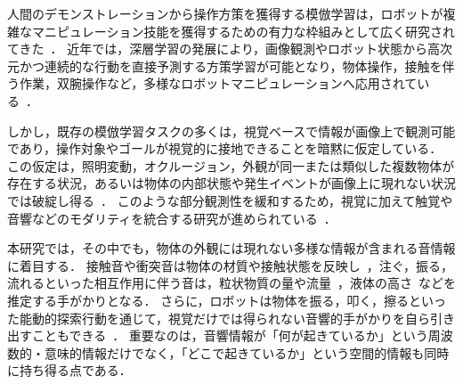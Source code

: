 \documentclass{article}
\begin{document}
人間のデモンストレーションから操作方策を獲得する模倣学習は，ロボットが複雑なマニピュレーション技能を獲得するための有力な枠組みとして広く研究されてきた~\citep{pomerleau1988alvinn,argall2009survey,osa2018algorithmic}．
近年では，深層学習の発展により，画像観測やロボット状態から高次元かつ連続的な行動を直接予測する方策学習が可能となり，物体操作，接触を伴う作業，双腕操作など，多様なロボットマニピュレーションへ応用されている~\citep{vla_survey2025}．

しかし，既存の模倣学習タスクの多くは，視覚ベースで情報が画像上で観測可能であり，操作対象やゴールが視覚的に接地できることを暗黙に仮定している．
この仮定は，照明変動，オクルージョン，外観が同一または類似した複数物体が存在する状況，あるいは物体の内部状態や発生イベントが画像上に現れない状況では破綻し得る~\citep{playitbyear}．
このような部分観測性を緩和するため，視覚に加えて触覚や音響などのモダリティを統合する研究が進められている~\citep{seehearfeel,vtt2022,sts_il2024,vitamin2024,tacthru2025,neuralfeels2024}．

本研究では，その中でも，物体の外観には現れない多様な情報が含まれる音情報に着目する．
接触音や衝突音は物体の材質や接触状態を反映し~\citep{eppe2018interactive,jin2019openenv,seehearfeel,thatsoundsright,hearingtouch2024,maniwav,multigen2025}，注ぐ，振る，流れるといった相互作用に伴う音は，粒状物質の量や流量~\citep{clarke2018learning,wilson2019pouring}，液体の高さ~\citep{liang2020audiopouring,du2021robotpouring}などを推定する手がかりとなる．
さらに，ロボットは物体を振る，叩く，擦るといった能動的探索行動を通じて，視覚だけでは得られない音響的手がかりを自ら引き出すこともできる~\citep{eppe2018interactive,caver2025,mosaic2024}．
重要なのは，音響情報が「何が起きているか」という周波数的・意味的情報だけでなく，「どこで起きているか」という空間的情報も同時に持ち得る点である．
\end{document}
